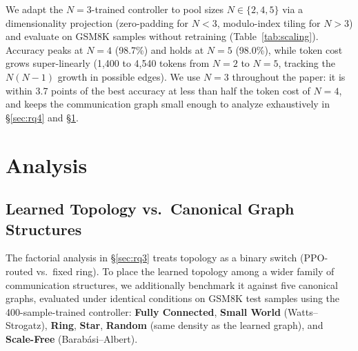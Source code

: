 \documentclass[11pt]{article}
\newcommand{\sys}{\textsc{SparseComm}\xspace}
\begin{document}
\begin{table}[t]
\centering
\small
{}
\caption{Scaling behavior vs.\ agent pool size (GSM8K, \sys).}
\label{tab:scaling}
\end{table}

We adapt the $N=3$-trained controller to pool sizes $N\in\{2,4,5\}$ via a
dimensionality projection (zero-padding for $N<3$, modulo-index tiling for
$N>3$) and evaluate on GSM8K samples without retraining
(Table~\ref{tab:scaling}). Accuracy peaks at $N=4$ (98.7\%) and holds at
$N=5$ (98.0\%), while token cost grows super-linearly (1,400 to 4,540
tokens from $N=2$ to $N=5$, tracking the $N(N-1)$ growth in possible
edges). We use $N=3$ throughout the paper: it is within 3.7 points of the
best accuracy at less than half the token cost of $N=4$, and keeps the
communication graph small enough to analyze exhaustively in
\S\ref{sec:rq4} and \S\ref{sec:analysis}.
\section{Analysis}
\label{sec:analysis}

\subsection{Learned Topology vs.\ Canonical Graph Structures}
\label{sec:canonical}

The factorial analysis in \S\ref{sec:rq3} treats topology as a binary
switch (PPO-routed vs.\ fixed ring). To place the learned topology among a
wider family of communication structures, we additionally benchmark it
against five canonical graphs, evaluated under identical conditions on
GSM8K test samples using the 400-sample-trained controller: \textbf{Fully
Connected}, \textbf{Small World} (Watts--Strogatz), \textbf{Ring},
\textbf{Star}, \textbf{Random} (same density as the learned graph), and
\textbf{Scale-Free} (Barab\'asi--Albert).
\end{document}
